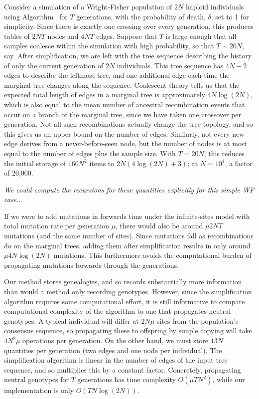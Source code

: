 \documentclass{article}
\newcommand{\plr}[1]{{\em \color{blue} #1}}
\begin{document}
Consider a simulation of a Wright-Fisher population of $2N$ haploid individuals 
using Algorithm~
for $T$ generations,
with the probability of death, $\delta$, set to 1 for simplicity.
Since there is exactly one crossing over every generation,
this produces tables of 
$2NT$ nodes and
$4NT$ edges.
Suppose that $T$ is large enough that all samples coalesce within the simulation with high probability,
so that $T \sim 20N$, say.
After simplification, we are left with the tree sequence describing the history
of only the current generation of $2N$ individuals.
This tree sequence has $4N-2$ edges to describe the leftmost tree,
and one additional edge each time the marginal tree changes along the sequence.
Coalescent theory tells us that 
the expected total length of edges in a marginal tree is approximately $4N\log(2N)$,
which is also equal to the mean number of ancestral recombination events that occur on a branch of the marginal tree,
since we have taken one crossover per generation.
Not all such recombinations actually change the tree topology,
and so this gives us an upper bound on the number of edges.
Similarly, not every new edge derives from a never-before-seen node,
but the number of nodes is at most equal to the number of edges plus the sample size.
With $T=20N$, this reduces the initial storage of $160 N^2$ items to $2N(4\log(2N) + 3)$;
at $N=10^4$, a factor of 20,000.

\plr{We could compute the recursions for these quantities explicitly for this simple WF case...}

If we were to add mutations in forwards time 
under the infinite-sites model with total mutation rate per generation $\mu$,
there would also be around $\mu 2NT$ mutations (and the same number of sites).
Since mutations fall as recombinations do on the marginal trees,
adding them after simplification results in only around $\mu 4 N \log(2N)$ mutations.
This furthermore avoids the computational burden of propagating mutations forwards through the generations.

Our method stores genealogies, and so records substantially more information 
than would a method only recording genotypes.
However, since the simplification algorithm requires some computational effort,
it is still informative to compare computational complexity of the algorithm
to one that propagates neutral genotypes.
A typical individual will differ at $2 N \mu$ sites from the population's consensus sequence,
so propagating these to offspring by simple copying will take $4 N^2 \mu$ operations per generation.
On the other hand, we must store $13N$ quantities per generation (two edges and one node per individual).
The simplification algorithm is linear in the number of edges of the input tree sequence,
and so multiplies this by a constant factor.
Concretely, propagating neutral genotypes for $T$ generations has time complexity $O(\mu T N^2)$,
while our implementation is only $O(T N \log(2N))$.
\end{document}

